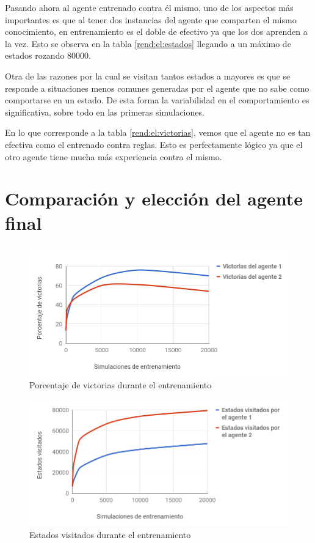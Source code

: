 Pasando ahora al agente entrenado contra él mismo, uno de los aspectos más importantes es que al tener dos instancias del agente que comparten el mismo conocimiento, en entrenamiento es el doble de efectivo ya que los dos aprenden a la vez. Esto se observa en la tabla \ref{rend:el:estados} llegando a un máximo de estados rozando 80000.

\bigskip

Otra de las razones por la cual se visitan tantos estados a mayores es que se responde a situaciones menos comunes generadas por el agente que no sabe como comportarse en un estado. De esta forma la variabilidad en el comportamiento es significativa, sobre todo en las primeras simulaciones.

\bigskip

En lo que corresponde a la tabla \ref{rend:el:victorias}, vemos que el agente no es tan efectiva como el entrenado contra reglas. Esto es perfectamente lógico ya que el otro agente tiene mucha más experiencia contra el mismo.


\section{Comparación y elección del agente final}

\begin{figure}
	\centerline{\includegraphics[width=15cm]{otros/otrasCapturas/grafico_victorias.png}}
	\caption{Porcentaje de victorias durante el entrenamiento}
	\label{graf:victorias}
\end{figure}

\begin{figure}
	\centerline{\includegraphics[width=15cm]{otros/otrasCapturas/grafico_estados.png}}
	\caption{Estados visitados durante el entrenamiento}
	\label{graf:estados}
\end{figure}

